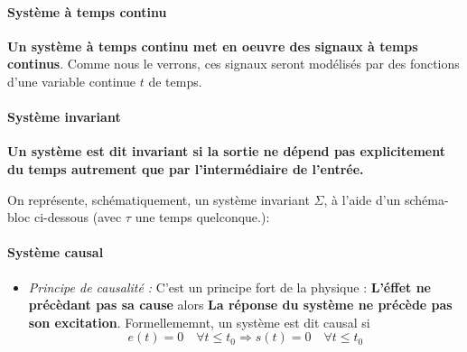 \paragraph{Système à temps continu}
\textbf{Un système à temps continu met en oeuvre des signaux 
à temps continus}. Comme nous le verrons, ces signaux seront
modélisés par des fonctions d'une variable continue $t$ de temps.
\paragraph{Système invariant}
\textbf{Un système est dit invariant si la sortie ne dépend pas 
explicitement du temps autrement que par l'intermédiaire de l'entrée.}

On représente, schématiquement, un système invariant $\Sigma$, à 
l'aide d'un schéma-bloc ci-dessous 
(avec $\tau$ une temps quelconque.): 
\begin{center}
    
\end{center}
\paragraph{Système causal}
\begin{itemize}
    \item \emph{Principe de causalité :}
        C'est un principe fort de la physique :
        \textbf{\og L'éffet ne précèdant pas sa cause\fg} alors 
        \textbf{\og La réponse du système ne précède pas son excitation\fg}.
        Formellememnt, un système est dit causal si 
        \[ e(t)=0\quad\forall t\le t_0 \Rightarrow s(t)=0\quad\forall t\le t_0\]
\end{itemize}
